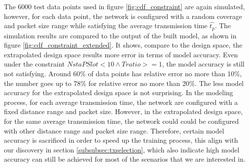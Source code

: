 The 6000 test data points used in figure \ref{fig:cdf_constraint} are again simulated, however, for each data point, the network is configured with a random coverage and packet size range while satisfying the average transmission time $\hat{t_p}$. The simulation results are compared to the output of the built model, as shown in figure \ref{fig:cdf_constraint_extended}. It shows, compare to the design space, the extrapolated design space results more error in terms of model accuracy. Even under the constraint $NstaPSlot < 10 \wedge Tratio >= 1$, the model accuracy is still not satisfying. Around 60\% of data points has relative error no more than 10\%, the number goes up to 78\% for relative error no more than 20\%. The less model accuracy for the extrapolated design space is not surprising. In the modeling process, for each average transmission time, the network are configured with a fixed distance range and packet size. However, in the extrapolated design space, for the same average transmission time, the network could could be configured with other distance range and packet size range. Therefore, certain model accuracy is sacrificed in order to speed up the training process, this align with our discovery in section \ref{subsubsec:txselection}, which also indicate high model accuracy can still be achieved for most of the scenarios that we are interested in. 
 
